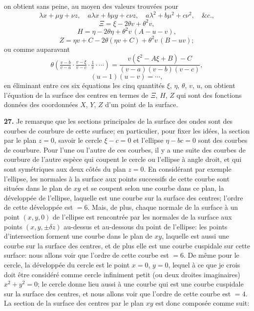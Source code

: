 \documentclass[11pt,a4paper]{article}
\begin{document}
on obtient sans peine, au moyen des valeurs trouv\'ees pour
\[
\lambda x + \mu y + \nu z,\quad a\lambda x + b\mu y + c\nu z,\quad a\lambda^2 + b\mu^2 + c\nu^2,\quad \&c.,
\]
\[
\Xi = \xi - 2\theta v + \theta^2 v,
\]
\[
H = \eta - 2\theta\eta + \theta^2 v\,(A - u - v),
\]
\[
Z = \eta v + C - 2\theta(\eta v + C) + \theta^2 v\,(B - uv);
\]
ou comme auparavant
\[
\theta\!\left(\tfrac{v - b}{v - a}\cdot\tfrac{v - \xi}{v - c} \cdot \tfrac{1}{v}\cdot \cdots\right) = \frac{v(\xi^2 - A\xi + B) - C}{(v - a)(v - b)(v - c)},
\]
\[
(u - 1)(u - v) = \cdots,
\]
en \'eliminant entre ces six \'equations les cinq quantit\'es $\xi$, $\eta$, $\theta$, $v$, $u$, on obtient l'\'equation de la surface des centres en termes de $\Xi$, $H$, $Z$ qui sont des fonctions donn\'ees des coordonn\'ees $X$, $Y$, $Z$ d'un point de la surface.

\textbf{27.} Je remarque que les sections principales de la surface des ondes sont des courbes de courbure de cette surface; en particulier, pour fixer les id\'ees, la section par le plan $z = 0$, savoir le cercle $\xi - c = 0$ et l'ellipse $\eta - bc = 0$ sont des courbes de courbure. Pour l'une ou l'autre de ces courbes, il y a une suite des courbes de courbure de l'autre esp\`ece qui coupent le cercle ou l'ellipse \`a angle droit, et qui sont sym\'etriques aux deux c\^ot\'es du plan $z = 0$. En consid\'erant par exemple l'ellipse, les normales \`a la surface aux points successifs de cette courbe sont situ\'ees dans le plan de $xy$ et se coupent selon une courbe dans ce plan, la d\'evelopp\'ee de l'ellipse, laquelle est une courbe sur la surface des centres; l'ordre de cette d\'evelopp\'ee est $= 6$. Mais, de plus, chaque normale de la surface \`a un point $(x, y, 0)$ de l'ellipse est rencontr\'ee par les normales de la surface aux points $(x, y, \pm \delta z)$ au-dessus et au-dessous du point de l'ellipse: les points d'intersection forment une courbe dans le plan de $xy$, laquelle est aussi une courbe sur la surface des centres, et de plus elle est une courbe cuspidale sur cette surface: nous allons voir que l'ordre de cette courbe est $= 6$. De m\^eme pour le cercle, la d\'evelopp\'ee du cercle est le point $x = 0$, $y = 0$, lequel \`a ce que je crois doit \^etre consid\'er\'e comme cercle infiniment petit (ou deux droites imaginaires) $x^2 + y^2 = 0$; le cercle donne lieu aussi \`a une courbe qui est une courbe cuspidale sur la surface des centres, et nous allons voir que l'ordre de cette courbe est $= 4$. La section de la surface des centres par le plan $xy$ est donc compos\'ee comme suit:
\end{document}
